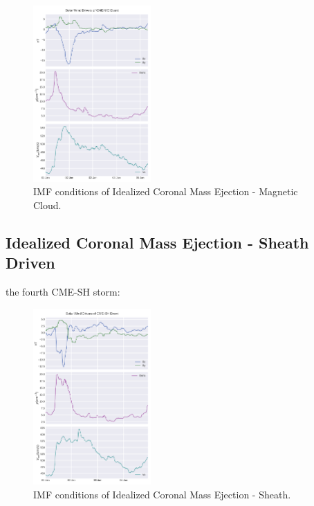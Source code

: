 \documentclass[utf8]{frontiersinFPHY_FAMS}
\begin{document}
\begin{figure}[!ht]
\begin{center}
\includegraphics[width=0.4\textwidth]{Ideal Magnetic Cloud.png}
\caption{IMF conditions of Idealized Coronal Mass Ejection - Magnetic Cloud.}
\label{fig:STORM2}
\end{center}
\end{figure}

\subsection{Idealized Coronal Mass Ejection - Sheath Driven}

the fourth CME-SH storm:

\begin{figure}[!ht]
\begin{center}
\includegraphics[width=0.4\textwidth]{Ideal_Sheath.png}
\caption{IMF conditions of Idealized Coronal Mass Ejection - Sheath.}
\label{fig:STORM3}
\end{center}
\end{figure}
\end{document}
